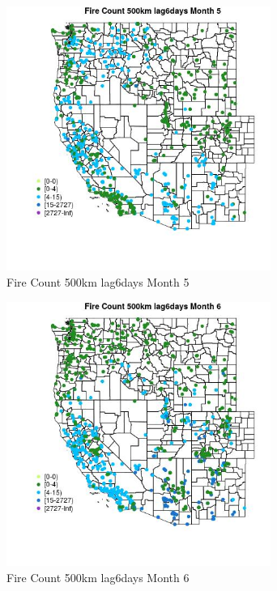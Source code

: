 \begin{figure} 
\centering  
\includegraphics[width=0.77\textwidth]{Code_Outputs/Report_ML_input_PM25_Step4_part_f_de_duplicated_aves_prioritize_24hr_obswNAs_MapObsMo5Fire_Count_500km_lag6days.jpg} 
\caption{\label{fig:Report_ML_input_PM25_Step4_part_f_de_duplicated_aves_prioritize_24hr_obswNAsMapObsMo5Fire_Count_500km_lag6days}Fire Count 500km lag6days Month 5} 
\end{figure} 
 

\begin{figure} 
\centering  
\includegraphics[width=0.77\textwidth]{Code_Outputs/Report_ML_input_PM25_Step4_part_f_de_duplicated_aves_prioritize_24hr_obswNAs_MapObsMo6Fire_Count_500km_lag6days.jpg} 
\caption{\label{fig:Report_ML_input_PM25_Step4_part_f_de_duplicated_aves_prioritize_24hr_obswNAsMapObsMo6Fire_Count_500km_lag6days}Fire Count 500km lag6days Month 6} 
\end{figure} 
 

